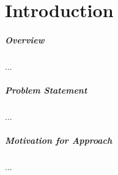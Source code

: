 \documentclass[
	fontsize=10pt, %
	twoside=false, %
	secnumdepth=1, %
  toc=indentunnumbered %
]{kaobook}
\begin{document}
\listoftables %

\endgroup


\mainmatter %







\chapter{Introduction}

\paragraph{Overview} ...

\paragraph{Problem Statement} ...

\paragraph{Motivation for Approach} ...

\end{document}
